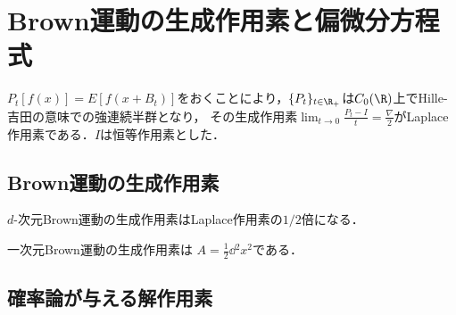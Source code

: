 \documentclass[uplatex,dvipdfmx]{jsreport}
\begin{document}
\section{Brown運動の生成作用素と偏微分方程式}

\begin{tcolorbox}[colframe=ForestGreen, colback=ForestGreen!10!white,breakable,colbacktitle=ForestGreen!40!white,coltitle=black,fonttitle=\bfseries\sffamily,
title=]
    $P_t[f(x)]=E[f(x+B_t)]$をおくことにより，$\{P_t\}_{t\in\R_+}$は$C_0(\R)$上でHille-吉田の意味での強連続半群となり，
    その生成作用素$\lim_{t\to0}\frac{P_t-I}{t}=\frac{\nabla}{2}$がLaplace作用素である．$I$は恒等作用素とした．
\end{tcolorbox}

\subsection{Brown運動の生成作用素}

\begin{tcolorbox}[colframe=ForestGreen, colback=ForestGreen!10!white,breakable,colbacktitle=ForestGreen!40!white,coltitle=black,fonttitle=\bfseries\sffamily,
    title=]
    $d$-次元Brown運動の生成作用素はLaplace作用素の$1/2$倍になる．
\end{tcolorbox}

\begin{proposition}
    一次元Brown運動の生成作用素は
    $A=\frac{1}{2}\dd{^2}{x^2}$である．
\end{proposition}

\subsection{確率論が与える解作用素}
\end{document}
